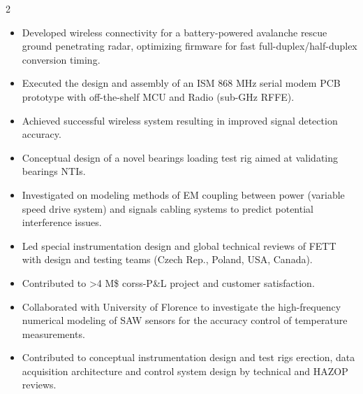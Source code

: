 \documentclass[9.5pt,a4paper,ragged2e,withhyper]{altacv} %
\begin{document}
\begin{paracol}{2}
\begin{itemize}
\item Developed wireless connectivity for a battery-powered avalanche rescue ground penetrating radar, optimizing firmware for fast full-duplex/half-duplex conversion timing.
\item Executed the design and assembly of an ISM 868 MHz serial modem PCB prototype with off-the-shelf MCU and Radio (sub-GHz RFFE).
\item Achieved successful wireless system resulting in improved signal detection accuracy.
\end{itemize}


\begin{itemize}
  \item Conceptual design of a novel bearings loading test rig aimed at validating bearings NTIs. 
  \item Investigated on modeling methods of EM coupling between power (variable speed drive system) 
  and signals cabling systems to predict potential interference issues.
\end{itemize}
\divider

\begin{itemize}
  \item Led special instrumentation design and global technical reviews of FETT with design
and testing teams (Czech Rep., Poland, USA, Canada).
  \item Contributed to >4 M\$ corss-P\&L project and customer satisfaction.
\end{itemize}
\divider

\begin{itemize}
\item Collaborated with University of Florence to investigate the high-frequency numerical modeling of SAW sensors for the accuracy control of temperature measurements.
\end{itemize}
\divider

\begin{itemize}
\item Contributed to conceptual instrumentation design and test rigs erection, data
acquisition architecture and control system design by technical and HAZOP reviews.
\end{itemize}
\divider


\end{paracol}
\end{document}
